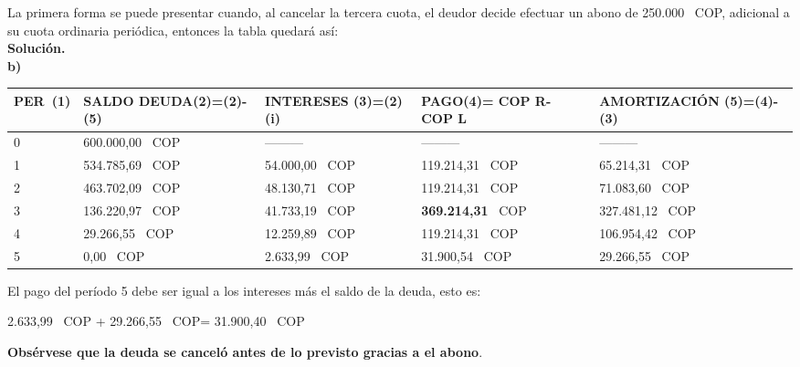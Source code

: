 La primera forma se puede presentar cuando, al cancelar la tercera cuota, el deudor decide efectuar un abono de 250.000 \ COP, adicional a su cuota ordinaria periódica, entonces la tabla quedará así:\\
\textbf{Solución.}\\
\textbf{b)}
\begin{spacing}{1.1}
	\begin{center}
    \footnotesize
		\begin{tabular}{|p{1cm}|p{2cm}|p{2cm}|p{2cm}|p{3cm}|}
			\hline
			\textbf{PER\ (1)} & \textbf{SALDO DEUDA(2)=(2)-(5)} & \textbf{INTERESES  (3)=(2)(i)} & \textbf{PAGO(4)= COP  R- COP  L } & \textbf{AMORTIZACIÓN  (5)=(4)-(3)} \\ \hline
			
			0                 &  600.000,00 \ COP                     & ---------                       & ---------                   & ---------                          \\ \hline
			1                 &  534.785,69 \ COP                     &  54.000,00 \ COP                    &  119.214,31 \ COP                &  65.214,31 \ COP                        \\ \hline
			2                 &  463.702,09 \ COP                     &  48.130,71 \ COP                    &  119.214,31 \ COP                &  71.083,60 \ COP                        \\ \hline
			3                 &  136.220,97 \ COP                     &  41.733,19 \ COP                     &  \textbf{369.214,31} \ COP                &  327.481,12 \ COP                       \\ \hline
			4                 &  29.266,55 \ COP                      &  12.259,89 \ COP                     &  119.214,31 \ COP                &  106.954,42 \ COP                       \\ \hline
			5                 &  0,00 \ COP                           &  2.633,99 \ COP                      &  31.900,54 \ COP                 &  29.266,55 \ COP                        \\ \hline
		\end{tabular}
	\end{center}
\end{spacing}

El pago del período 5 debe ser igual a los intereses más el saldo de la deuda, esto es:
\begin{center}
	 2.633,99 \ COP +  29.266,55 \ COP=  31.900,40 \ COP
\end{center}
\textbf{Obsérvese que la deuda se canceló antes de lo previsto gracias a el abono}.\\

